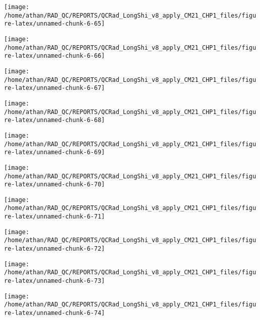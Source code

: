 \documentclass[
  10pt,
  a4paper,oneside]{article}
\begin{document}
\begin{center}\texttt{[image: /home/athan/RAD\_QC/REPORTS/QCRad\_LongShi\_v8\_apply\_CM21\_CHP1\_files/figure-latex/unnamed-chunk-6-65]} \end{center}

\begin{center}\texttt{[image: /home/athan/RAD\_QC/REPORTS/QCRad\_LongShi\_v8\_apply\_CM21\_CHP1\_files/figure-latex/unnamed-chunk-6-66]} \end{center}

\begin{center}\texttt{[image: /home/athan/RAD\_QC/REPORTS/QCRad\_LongShi\_v8\_apply\_CM21\_CHP1\_files/figure-latex/unnamed-chunk-6-67]} \end{center}

\begin{center}\texttt{[image: /home/athan/RAD\_QC/REPORTS/QCRad\_LongShi\_v8\_apply\_CM21\_CHP1\_files/figure-latex/unnamed-chunk-6-68]} \end{center}

\begin{center}\texttt{[image: /home/athan/RAD\_QC/REPORTS/QCRad\_LongShi\_v8\_apply\_CM21\_CHP1\_files/figure-latex/unnamed-chunk-6-69]} \end{center}

\begin{center}\texttt{[image: /home/athan/RAD\_QC/REPORTS/QCRad\_LongShi\_v8\_apply\_CM21\_CHP1\_files/figure-latex/unnamed-chunk-6-70]} \end{center}

\begin{center}\texttt{[image: /home/athan/RAD\_QC/REPORTS/QCRad\_LongShi\_v8\_apply\_CM21\_CHP1\_files/figure-latex/unnamed-chunk-6-71]} \end{center}

\begin{center}\texttt{[image: /home/athan/RAD\_QC/REPORTS/QCRad\_LongShi\_v8\_apply\_CM21\_CHP1\_files/figure-latex/unnamed-chunk-6-72]} \end{center}

\begin{center}\texttt{[image: /home/athan/RAD\_QC/REPORTS/QCRad\_LongShi\_v8\_apply\_CM21\_CHP1\_files/figure-latex/unnamed-chunk-6-73]} \end{center}

\begin{center}\texttt{[image: /home/athan/RAD\_QC/REPORTS/QCRad\_LongShi\_v8\_apply\_CM21\_CHP1\_files/figure-latex/unnamed-chunk-6-74]} \end{center}
\end{document}
